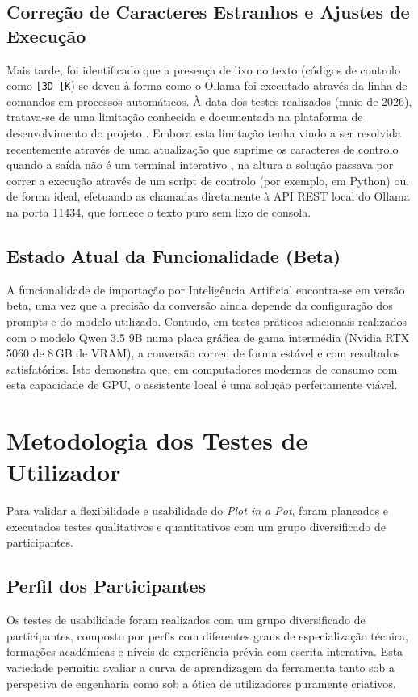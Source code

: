 \subsection{Correção de Caracteres Estranhos e Ajustes de Execução}
Mais tarde, foi identificado que a presença de lixo no texto (códigos de controlo como \texttt{[3D [K}) se deveu à forma como o Ollama foi executado através da linha de comandos em processos automáticos. À data dos testes realizados (maio de 2026), tratava-se de uma limitação conhecida e documentada na plataforma de desenvolvimento do projeto \citep{OllamaIssue14571}. Embora esta limitação tenha vindo a ser resolvida recentemente através de uma atualização que suprime os caracteres de controlo quando a saída não é um terminal interativo \citep{OllamaPull17112}, na altura a solução passava por correr a execução através de um script de controlo (por exemplo, em Python) ou, de forma ideal, efetuando as chamadas diretamente à API REST local do Ollama na porta 11434, que fornece o texto puro sem lixo de consola.

\subsection{Estado Atual da Funcionalidade (Beta)}
A funcionalidade de importação por Inteligência Artificial encontra-se em versão beta, uma vez que a precisão da conversão ainda depende da configuração dos prompts e do modelo utilizado. Contudo, em testes práticos adicionais realizados com o modelo Qwen 3.5 9B numa placa gráfica de gama intermédia (Nvidia RTX 5060 de 8\,GB de VRAM), a conversão correu de forma estável e com resultados satisfatórios. Isto demonstra que, em computadores modernos de consumo com esta capacidade de GPU, o assistente local é uma solução perfeitamente viável.


\section{Metodologia dos Testes de Utilizador}
Para validar a flexibilidade e usabilidade do \textit{Plot in a Pot}, foram planeados e executados testes qualitativos e quantitativos com um grupo diversificado de participantes.

\subsection{Perfil dos Participantes}
Os testes de usabilidade foram realizados com um grupo diversificado de participantes, composto por perfis com diferentes graus de especialização técnica, formações académicas e níveis de experiência prévia com escrita interativa. Esta variedade permitiu avaliar a curva de aprendizagem da ferramenta tanto sob a perspetiva de engenharia como sob a ótica de utilizadores puramente criativos.

